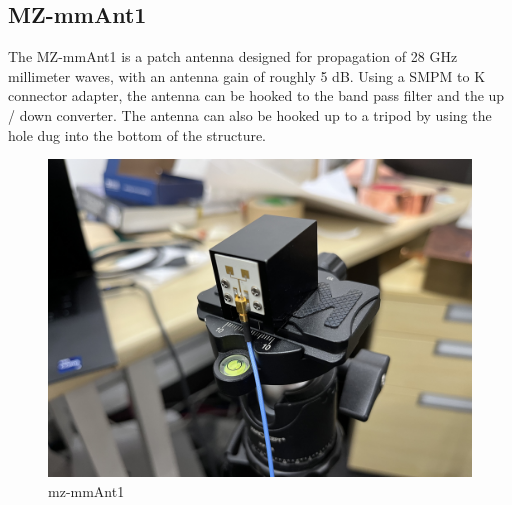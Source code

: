 \documentclass[a4paper,12pt]{report}
\begin{document}
\subsection{MZ-mmAnt1}

The MZ-mmAnt1 is a patch antenna designed for
propagation of 28 GHz millimeter waves,
with an antenna gain of roughly 5 dB.
Using a SMPM to K connector adapter,
the antenna can be hooked to the band pass filter
and the up / down converter.
The antenna can also be hooked up to a tripod
by using the hole dug into the bottom of the structure.

\begin{figure}
  \centering
  \begin{minipage}{0.45\textwidth}
    \centering
    \includegraphics[clip, keepaspectratio, width=0.9\linewidth]{img/mz-mmant1.jpg}
    \caption{mz-mmAnt1}
    \label{img:mz_mmant1}
  \end{minipage}\hfill
  \begin{minipage}{0.45\textwidth}
    \centering

\end{minipage}
\end{figure}
\end{document}
